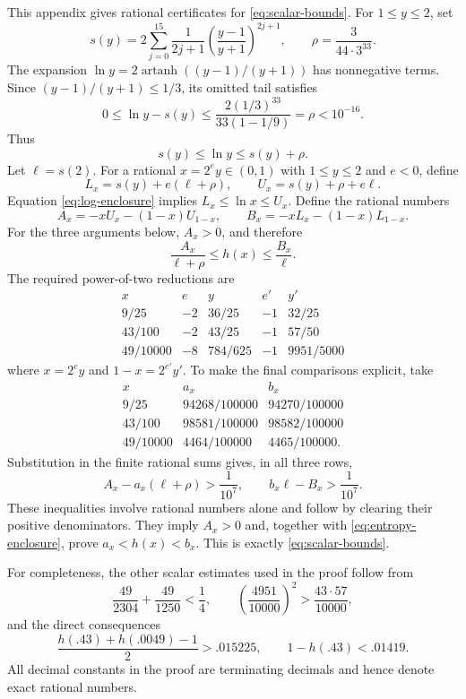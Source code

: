 \documentclass[11pt,leqno]{amsart}
\numberwithin{equation}{section}
\theoremstyle{definition}
\theoremstyle{remark}
\begin{document}
This appendix gives rational certificates for \eqref{eq:scalar-bounds}. For $1\le y\le2$, set
\[
 s(y)=2\sum_{j=0}^{15}\frac{1}{2j+1}
       \left(\frac{y-1}{y+1}\right)^{2j+1},
 \qquad \rho=\frac{3}{44\cdot3^{33}}.
\]
The expansion $\ln y=2\operatorname{artanh}((y-1)/(y+1))$ has nonnegative terms. Since $(y-1)/(y+1)\le1/3$, its omitted tail satisfies
\[
 0\le\ln y-s(y)
 \le\frac{2(1/3)^{33}}{33(1-1/9)}=\rho<10^{-16}.
\]
Thus
\begin{equation}\label{eq:log-enclosure}
 s(y)\le\ln y\le s(y)+\rho.
\end{equation}
Let $\ell=s(2)$. For a rational $x=2^e y\in(0,1)$ with $1\le y\le2$ and $e<0$, define
\[
 L_x=s(y)+e(\ell+\rho),\qquad
 U_x=s(y)+\rho+e\ell.
\]
Equation \eqref{eq:log-enclosure} implies $L_x\le\ln x\le U_x$. Define the rational numbers
\[
 A_x=-xU_x-(1-x)U_{1-x},\qquad
 B_x=-xL_x-(1-x)L_{1-x}.
\]
For the three arguments below, $A_x>0$, and therefore
\begin{equation}\label{eq:entropy-enclosure}
 \frac{A_x}{\ell+\rho}\le h(x)\le\frac{B_x}{\ell}.
\end{equation}
The required power-of-two reductions are
\[
\begin{array}{c|cc|cc}
 x&e&y&e'&y'\\ \hline
 9/25&-2&36/25&-1&32/25\\
 43/100&-2&43/25&-1&57/50\\
 49/10000&-8&784/625&-1&9951/5000
\end{array}
\]
where $x=2^e y$ and $1-x=2^{e'}y'$. To make the final comparisons explicit, take
\[
\begin{array}{c|cc}
 x&a_x&b_x\\ \hline
 9/25&94268/100000&94270/100000\\
 43/100&98581/100000&98582/100000\\
 49/10000&4464/100000&4465/100000.
\end{array}
\]
Substitution in the finite rational sums gives, in all three rows,
\begin{equation}\label{eq:rational-certificates}
 A_x-a_x(\ell+\rho)>\frac1{10^7},\qquad
 b_x\ell-B_x>\frac1{10^7}.
\end{equation}
These inequalities involve rational numbers alone and follow by clearing their positive denominators. They imply $A_x>0$ and, together with \eqref{eq:entropy-enclosure}, prove $a_x<h(x)<b_x$. This is exactly \eqref{eq:scalar-bounds}.

For completeness, the other scalar estimates used in the proof follow from
\[
 \frac{49}{2304}+\frac{49}{1250}<\frac14,
 \qquad \left(\frac{4951}{10000}\right)^2>\frac{43\cdot57}{10000},
\]
and the direct consequences
\[
 \frac{h(.43)+h(.0049)-1}{2}>.015225,
 \qquad 1-h(.43)<.01419.
\]
All decimal constants in the proof are terminating decimals and hence denote exact rational numbers.
\end{document}
